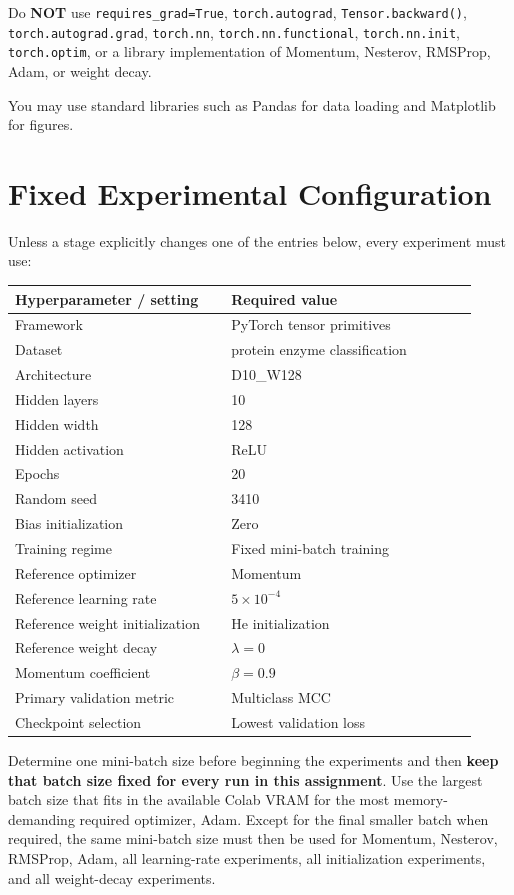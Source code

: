 \documentclass[11pt]{article}
\begin{document}
Do \textbf{NOT} use \texttt{requires\_grad=True}, \texttt{torch.autograd}, \texttt{Tensor.backward()}, \texttt{torch.autograd.grad}, \texttt{torch.nn}, \texttt{torch.nn.functional}, \texttt{torch.nn.init}, \texttt{torch.optim}, or a library implementation of Momentum, Nesterov, RMSProp, Adam, or weight decay.

You may use standard libraries such as Pandas for data loading and Matplotlib for figures.

\section{Fixed Experimental Configuration}
Unless a stage explicitly changes one of the entries below, every experiment must use:

\begin{center}
\begin{tabular}{>{\raggedright\arraybackslash}p{0.43\linewidth} p{0.49\linewidth}}
\toprule
Hyperparameter / setting & Required value \\
\midrule
Framework & PyTorch tensor primitives \\
Dataset & protein enzyme classification \\
Architecture & D10\_W128 \\
Hidden layers & 10 \\
Hidden width & 128 \\
Hidden activation & ReLU \\
Epochs & 20 \\
Random seed & 3410 \\
Bias initialization & Zero \\
Training regime & Fixed mini-batch training \\
Reference optimizer & Momentum \\
Reference learning rate & $5\times 10^{-4}$ \\
Reference weight initialization & He initialization \\
Reference weight decay & $\lambda=0$ \\
Momentum coefficient & $\beta=0.9$ \\
Primary validation metric & Multiclass MCC \\
Checkpoint selection & Lowest validation loss \\
\bottomrule
\end{tabular}
\end{center}

Determine one mini-batch size before beginning the experiments and then \textbf{keep that batch size fixed for every run in this assignment}. Use the largest batch size that fits in the available Colab VRAM for the most memory-demanding required optimizer, Adam. Except for the final smaller batch when required, the same mini-batch size must then be used for Momentum, Nesterov, RMSProp, Adam, all learning-rate experiments, all initialization experiments, and all weight-decay experiments.
\end{document}
